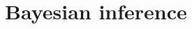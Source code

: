 \documentclass[usenames,dvipsnames,t]{beamer}
\begin{document}


    

\section{Bayesian inference}
\end{document}

